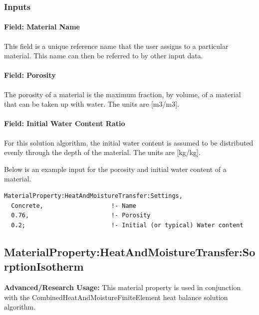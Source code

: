 \subsubsection{Inputs}\label{inputs-7-026}

\paragraph{Field: Material Name}\label{field-material-name-000}

This field is a unique reference name that the user assigns to a particular material. This name can then be referred to by other input data.

\paragraph{Field: Porosity}\label{field-porosity}

The porosity of a material is the maximum fraction, by volume, of a material that can be taken up with water. The units are {[}m3/m3{]}.

\paragraph{Field: Initial Water Content Ratio}\label{field-initial-water-content-ratio}

For this solution algorithm, the initial water content is assumed to be distributed evenly through the depth of the material. The units are {[}kg/kg{]}.

Below is an example input for the porosity and initial water content of a material.

\begin{lstlisting}
MaterialProperty:HeatAndMoistureTransfer:Settings,
  Concrete,                   !- Name
  0.76,                       !- Porosity
  0.2;                        !- Initial (or typical) Water content
\end{lstlisting}

\subsection{MaterialProperty:HeatAndMoistureTransfer:SorptionIsotherm}\label{materialpropertyheatandmoisturetransfersorptionisotherm}

\textbf{Advanced/Research Usage:} This material property is used in conjunction with the CombinedHeatAndMoistureFiniteElement heat balance solution algorithm.

